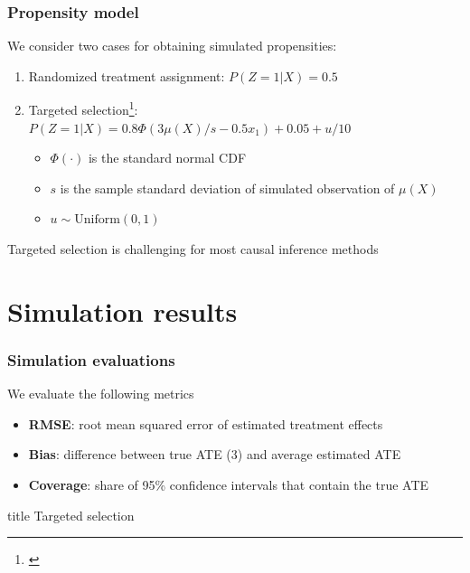 \documentclass[compress]{beamer}
\begin{document}
\begin{frame} \frametitle{Propensity model}
We consider two cases for obtaining simulated propensities:

\begin{enumerate}
\item Randomized treatment assignment: $P(Z = 1 | X) = 0.5$
\item Targeted selection\footnote[frame]{\cite{hahn2017bayesian}}: $P(Z = 1 | X) = 0.8\Phi(3 \mu(X) / s - 0.5 x_1) + 0.05 + u / 10$
\begin{itemize}
	\item $\Phi(\cdot)$ is the standard normal CDF
	\item $s$ is the sample standard deviation of simulated observation of $\mu(X)$
	\item $u \sim \mathrm{Uniform}(0, 1)$ 
\end{itemize}
\end{enumerate}

\bigskip
Targeted selection is challenging for most causal inference methods
\end{frame}

\section[Simulation results]{Simulation results}

\begin{frame} \frametitle{Simulation evaluations}
We evaluate the following metrics

\begin{itemize}
	\item \textbf{RMSE}: root mean squared error of estimated treatment effects
	\item \textbf{Bias}: difference between true ATE (3) and average estimated ATE
	\item \textbf{Coverage}: share of 95\% confidence intervals that contain the true ATE
\end{itemize}

\transboxin
\end{frame}

\begin{frame}
\vfill
\centering
\begin{beamercolorbox}[sep=8pt,center,shadow=true,rounded=true]{title}
Targeted selection\par%
\end{beamercolorbox}
\vfill
\end{frame}
\end{document}
